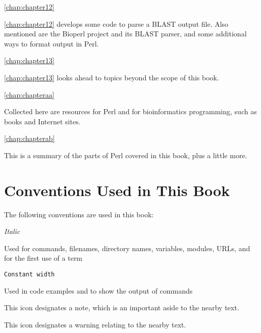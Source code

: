 \autoref{chap:chapter12}
\begin{adjustwidth}{1cm}{0cm}
\autoref{chap:chapter12} develops some code to parse a BLAST output file. Also mentioned are the Bioperl project and its BLAST parser, and some additional ways to format output in Perl.
\end{adjustwidth}

\autoref{chap:chapter13}
\begin{adjustwidth}{1cm}{0cm}
\autoref{chap:chapter13} looks ahead to topics beyond the scope of this book.
\end{adjustwidth}

\autoref{chap:chapteraa}
\begin{adjustwidth}{1cm}{0cm}
Collected here are resources for Perl and for bioinformatics programming, such as books and Internet sites.
\end{adjustwidth}

\autoref{chap:chapterab}
\begin{adjustwidth}{1cm}{0cm}
This is a summary of the parts of Perl covered in this book, plus a little more.
\end{adjustwidth}

\section*{Conventions Used in This Book}
The following conventions are used in this book:

\textit{Italic}
\begin{adjustwidth}{1cm}{0cm}
Used for commands, filenames, directory names, variables, modules, URLs, and for the first use of a term 
\end{adjustwidth}

\texttt{Constant width}
\begin{adjustwidth}{1cm}{0cm}
Used in code examples and to show the output of commands
\end{adjustwidth}

\begin{adjustwidth}{2cm}{2cm}
\noindent
This icon designates a note, which is an important aside to the nearby text.
\end{adjustwidth}

\begin{adjustwidth}{2cm}{2cm}
\noindent
This icon designates a warning relating to the nearby text.
\end{adjustwidth}

